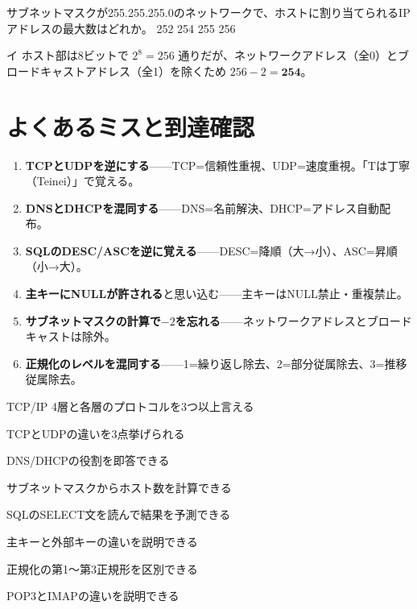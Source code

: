 \begin{itpmon}{%
サブネットマスクが255.255.255.0のネットワークで、ホストに割り当てられるIPアドレスの最大数はどれか。}
\sentakushi
  {252}
  {254}
  {255}
  {256}
\end{itpmon}
\begin{kaisetsu}{イ}
ホスト部は8ビットで $2^8 = 256$ 通りだが、ネットワークアドレス（全0）とブロードキャストアドレス（全1）を除くため $256 - 2 = \textbf{254}$。
\end{kaisetsu}

\section{よくあるミスと到達確認}

\begin{yokumiss}[この章でよくあるミス]
\begin{enumerate}[leftmargin=1.6em, itemsep=5pt]
  \item \textbf{TCPとUDPを逆にする}——TCP=信頼性重視、UDP=速度重視。「Tは丁寧（Teinei）」で覚える。
  \item \textbf{DNSとDHCPを混同する}——DNS=名前解決、DHCP=アドレス自動配布。
  \item \textbf{SQLのDESC/ASCを逆に覚える}——DESC=降順（大→小）、ASC=昇順（小→大）。
  \item \textbf{主キーにNULLが許される}と思い込む——主キーはNULL禁止・重複禁止。
  \item \textbf{サブネットマスクの計算で$-2$を忘れる}——ネットワークアドレスとブロードキャストは除外。
  \item \textbf{正規化のレベルを混同する}——1=繰り返し除去、2=部分従属除去、3=推移従属除去。
\end{enumerate}
\end{yokumiss}

\begin{tatsaku}
  \item TCP/IP 4層と各層のプロトコルを3つ以上言える
  \item TCPとUDPの違いを3点挙げられる
  \item DNS/DHCPの役割を即答できる
  \item サブネットマスクからホスト数を計算できる
  \item SQLのSELECT文を読んで結果を予測できる
  \item 主キーと外部キーの違いを説明できる
  \item 正規化の第1〜第3正規形を区別できる
  \item POP3とIMAPの違いを説明できる
\end{tatsaku}

